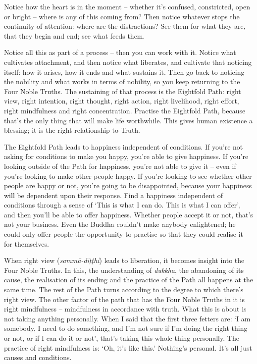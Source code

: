 Notice how the heart is in the moment -- whether it's confused, constricted,
open or bright -- where is any of this coming from? Then notice whatever stops
the continuity of attention: where are the distractions? See them for what they
are, that they begin and end; see what feeds them.

Notice all this as part of a process -- then you can work with it. Notice what
cultivates attachment, and then notice what liberates, and cultivate that
noticing itself: how it arises, how it ends and what sustains it. Then go back
to noticing the nobility and what works in terms of nobility, so you keep
returning to the Four Noble Truths. The sustaining of that process is the
Eightfold Path: right view, right intention, right thought, right action, right
livelihood, right effort, right mindfulness and right concentration. Practise
the Eightfold Path, because that's the only thing that will make life
worthwhile. This gives human existence a blessing; it is the right relationship
to Truth.

The Eightfold Path leads to happiness independent of conditions. If you're not
asking for conditions to make you happy, you're able to give happiness. If
you're looking outside of the Path for happiness, you're not able to give it --
even if you're looking to make other people happy. If you're looking to see
whether other people are happy or not, you're going to be disappointed, because
your happiness will be dependent upon their response. Find a happiness
independent of conditions through a sense of `This is what I can do. This is
what I can offer', and then you'll be able to offer happiness. Whether people
accept it or not, that's not your business. Even the Buddha couldn't make
anybody enlightened; he could only offer people the opportunity to practise so
that they could realise it for themselves.

When right view (\emph{sammā-diṭṭhi}) leads to liberation, it becomes insight
into the Four Noble Truths. In this, the understanding of \emph{dukkha}, the
abandoning of its cause, the realisation of its ending and the practice of the
Path all happens at the same time. The rest of the Path turns according to the
degree to which there's right view. The other factor of the path that has the
Four Noble Truths in it is right mindfulness -- mindfulness in accordance with
truth. What this is about is not taking anything personally. When I said that
the first three fetters are: `I am somebody, I need to do something, and I'm not
sure if I'm doing the right thing or not, or if I can do it or not', that's
taking this whole thing personally. The practice of right mindfulness is: `Oh,
it's like this.' Nothing's personal. It's all just causes and conditions.

